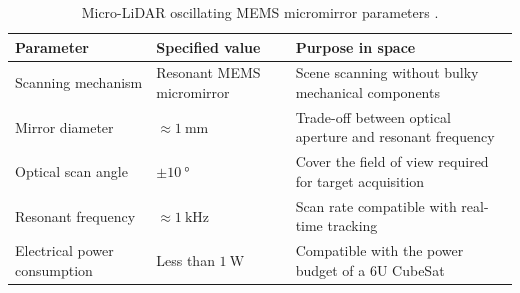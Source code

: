 \begin{itemize}
    \begin{table}[H]
      \centering
      \small
      \caption{Micro-LiDAR oscillating MEMS micromirror parameters \cite{Liu2022}.}
      \label{tab:lidar_mems}
      \begin{tabular}{p{3.3cm} p{4.7cm} p{6.5cm}}
        \toprule
        \textbf{Parameter} & \textbf{Specified value} & \textbf{Purpose in space} \\
        \midrule
        Scanning mechanism & Resonant MEMS micromirror & Scene scanning without bulky mechanical components \\ %
        Mirror diameter & $\approx\SI{1}{\milli\metre}$ & Trade-off between optical aperture and resonant frequency \\ %
        Optical scan angle & $\pm\SI{10}{\degree}$ & Cover the field of view required for target acquisition \\ %
        Resonant frequency & $\approx\SI{1}{\kilo\hertz}$ & Scan rate compatible with real-time tracking \\ %
        Electrical power consumption & Less than $\SI{1}{\watt}$ & Compatible with the power budget of a 6U CubeSat \\ %
        \bottomrule
      \end{tabular}
    \end{table}
\end{itemize}

